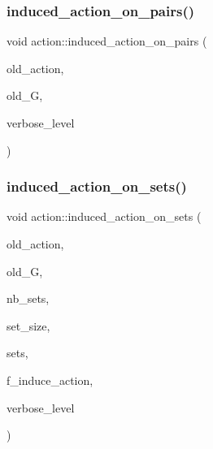 \subsubsection{\texorpdfstring{induced\+\_\+action\+\_\+on\+\_\+pairs()}{induced\_action\_on\_pairs()}}
{\footnotesize\ttfamily void action\+::induced\+\_\+action\+\_\+on\+\_\+pairs (\begin{DoxyParamCaption}\item[{\mbox{\hyperlink{classaction}{action}} \&}]{old\+\_\+action,  }\item[{\mbox{\hyperlink{classsims}{sims}} $\ast$}]{old\+\_\+G,  }\item[{\mbox{\hyperlink{galois_8h_a09fddde158a3a20bd2dcadb609de11dc}{I\+NT}}}]{verbose\+\_\+level }\end{DoxyParamCaption})}

\mbox{\label{classaction_a09639acee6b88644c103b17050cc32f1}} 
\subsubsection{\texorpdfstring{induced\+\_\+action\+\_\+on\+\_\+sets()}{induced\_action\_on\_sets()}}
{\footnotesize\ttfamily void action\+::induced\+\_\+action\+\_\+on\+\_\+sets (\begin{DoxyParamCaption}\item[{\mbox{\hyperlink{classaction}{action}} \&}]{old\+\_\+action,  }\item[{\mbox{\hyperlink{classsims}{sims}} $\ast$}]{old\+\_\+G,  }\item[{\mbox{\hyperlink{galois_8h_a09fddde158a3a20bd2dcadb609de11dc}{I\+NT}}}]{nb\+\_\+sets,  }\item[{\mbox{\hyperlink{galois_8h_a09fddde158a3a20bd2dcadb609de11dc}{I\+NT}}}]{set\+\_\+size,  }\item[{\mbox{\hyperlink{galois_8h_a09fddde158a3a20bd2dcadb609de11dc}{I\+NT}} $\ast$}]{sets,  }\item[{\mbox{\hyperlink{galois_8h_a09fddde158a3a20bd2dcadb609de11dc}{I\+NT}}}]{f\+\_\+induce\+\_\+action,  }\item[{\mbox{\hyperlink{galois_8h_a09fddde158a3a20bd2dcadb609de11dc}{I\+NT}}}]{verbose\+\_\+level }\end{DoxyParamCaption})}

